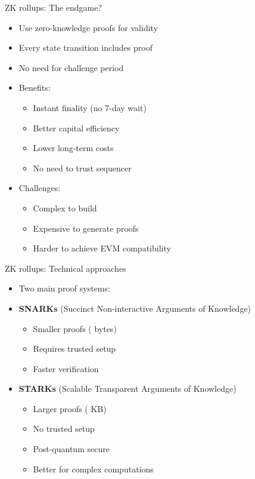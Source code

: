 \documentclass[aspectratio=169, lualatex, handout]{beamer}
\begin{document}
\begin{frame}{ZK rollups: The endgame?}
	\begin{itemize}
		\item Use zero-knowledge proofs for validity
		\item Every state transition includes proof
		\item No need for challenge period
		\item Benefits:
		      \begin{itemize}
			      \item Instant finality (no 7-day wait)
			      \item Better capital efficiency
			      \item Lower long-term costs
			      \item No need to trust sequencer
		      \end{itemize}
		\item Challenges:
		      \begin{itemize}
			      \item Complex to build
			      \item Expensive to generate proofs
			      \item Harder to achieve EVM compatibility
		      \end{itemize}
	\end{itemize}
\end{frame}

\begin{frame}{ZK rollups: Technical approaches}
	\begin{itemize}
		\item Two main proof systems:
		\item \textbf{SNARKs} (Succinct Non-interactive Arguments of Knowledge)
		      \begin{itemize}
			      \item Smaller proofs ( bytes)
			      \item Requires trusted setup
			      \item Faster verification
		      \end{itemize}
		\item \textbf{STARKs} (Scalable Transparent Arguments of Knowledge)
		      \begin{itemize}
			      \item Larger proofs ( KB)
			      \item No trusted setup
			      \item Post-quantum secure
			      \item Better for complex computations
		      \end{itemize}
	\end{itemize}
\end{frame}
\end{document}
